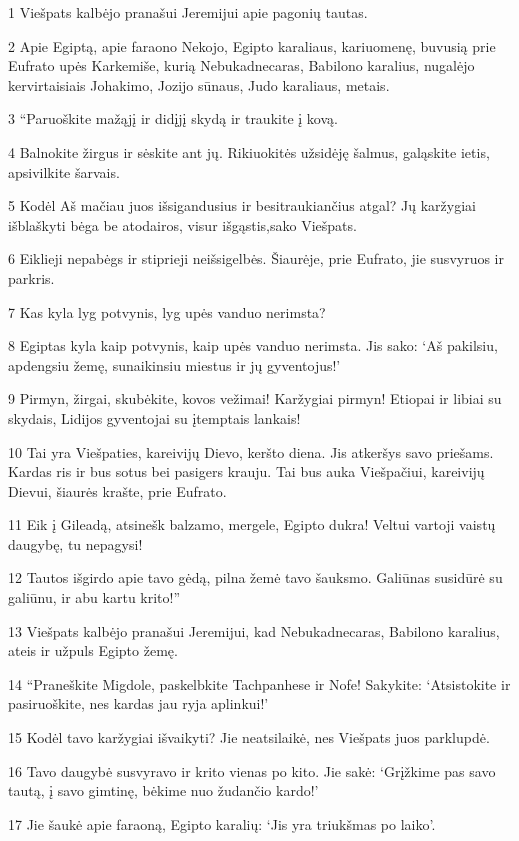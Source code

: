 \par 1 Viešpats kalbėjo pranašui Jeremijui apie pagonių tautas. 
\par 2 Apie Egiptą, apie faraono Nekojo, Egipto karaliaus, kariuomenę, buvusią prie Eufrato upės Karkemiše, kurią Nebukadnecaras, Babilono karalius, nugalėjo kervirtaisiais Johakimo, Jozijo sūnaus, Judo karaliaus, metais. 
\par 3 “Paruoškite mažąjį ir didįjį skydą ir traukite į kovą. 
\par 4 Balnokite žirgus ir sėskite ant jų. Rikiuokitės užsidėję šalmus, galąskite ietis, apsivilkite šarvais. 
\par 5 Kodėl Aš mačiau juos išsigandusius ir besitraukiančius atgal? Jų karžygiai išblaškyti bėga be atodairos, visur išgąstis,­sako Viešpats.­ 
\par 6 Eiklieji nepabėgs ir stiprieji neišsigelbės. Šiaurėje, prie Eufrato, jie susvyruos ir parkris. 
\par 7 Kas kyla lyg potvynis, lyg upės vanduo nerimsta? 
\par 8 Egiptas kyla kaip potvynis, kaip upės vanduo nerimsta. Jis sako: ‘Aš pakilsiu, apdengsiu žemę, sunaikinsiu miestus ir jų gyventojus!’ 
\par 9 Pirmyn, žirgai, skubėkite, kovos vežimai! Karžygiai pirmyn! Etiopai ir libiai su skydais, Lidijos gyventojai su įtemptais lankais! 
\par 10 Tai yra Viešpaties, kareivijų Dievo, keršto diena. Jis atkeršys savo priešams. Kardas ris ir bus sotus bei pasigers krauju. Tai bus auka Viešpačiui, kareivijų Dievui, šiaurės krašte, prie Eufrato. 
\par 11 Eik į Gileadą, atsinešk balzamo, mergele, Egipto dukra! Veltui vartoji vaistų daugybę, tu nepagysi! 
\par 12 Tautos išgirdo apie tavo gėdą, pilna žemė tavo šauksmo. Galiūnas susidūrė su galiūnu, ir abu kartu krito!” 
\par 13 Viešpats kalbėjo pranašui Jeremijui, kad Nebukadnecaras, Babilono karalius, ateis ir užpuls Egipto žemę. 
\par 14 “Praneškite Migdole, paskelbkite Tachpanhese ir Nofe! Sakykite: ‘Atsistokite ir pasiruoškite, nes kardas jau ryja aplinkui!’ 
\par 15 Kodėl tavo karžygiai išvaikyti? Jie neatsilaikė, nes Viešpats juos parklupdė. 
\par 16 Tavo daugybė susvyravo ir krito vienas po kito. Jie sakė: ‘Grįžkime pas savo tautą, į savo gimtinę, bėkime nuo žudančio kardo!’ 
\par 17 Jie šaukė apie faraoną, Egipto karalių: ‘Jis yra triukšmas po laiko’. 
